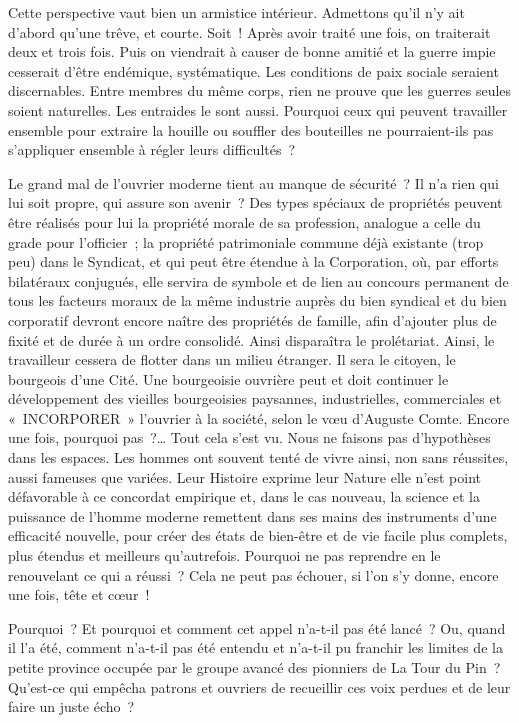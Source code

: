 \documentclass[french,twoside]{book} %
\begin{document}
Cette perspective vaut bien un armistice intérieur. Admettons qu’il n’y ait d’abord qu’une trêve, et courte. Soit ! Après avoir traité une fois, on traiterait deux et trois fois. Puis on viendrait à causer de bonne amitié et la guerre impie cesserait d’être endémique, systématique. Les conditions de paix sociale seraient discernables. Entre membres du même corps, rien ne prouve que les guerres seules soient naturelles. Les entraides le sont aussi. Pourquoi ceux qui peuvent travailler ensemble pour extraire la houille ou souffler des bouteilles ne pourraient-ils pas s’appliquer ensemble à régler leurs difficultés ?\par
Le grand mal de l’ouvrier moderne tient au manque de sécurité ? Il n’a rien qui lui soit propre, qui assure son avenir ? Des types spéciaux de propriétés peuvent être réalisés pour lui la propriété morale de sa profession, analogue a celle du grade pour l’officier ; la propriété patrimoniale commune déjà existante (trop peu) dans le Syndicat, et qui peut être étendue à la Corporation, où, par efforts bilatéraux conjugués, elle servira de symbole et de lien au concours permanent de tous les facteurs moraux de la même industrie auprès du bien syndical et du bien corporatif devront encore naître des propriétés de famille, afin d’ajouter plus de fixité et de durée à un ordre consolidé. Ainsi disparaîtra le prolétariat. Ainsi, le travailleur cessera de flotter dans un milieu étranger. Il sera le citoyen, le bourgeois d’une Cité. Une bourgeoisie ouvrière peut et doit continuer le développement des vieilles bourgeoisies paysannes, industrielles, commerciales et « INCORPORER » l’ouvrier à la société, selon le vœu d’Auguste Comte. Encore une fois, pourquoi pas ?… Tout cela s’est vu. Nous ne faisons pas d’hypothèses dans les espaces. Les hommes ont souvent tenté de vivre ainsi, non sans réussites, aussi fameuses que variées. Leur Histoire exprime leur Nature elle n’est point défavorable à ce concordat empirique et, dans le cas nouveau, la science et la puissance de l’homme moderne remettent dans ses mains des instruments d’une efficacité nouvelle, pour créer des états de bien-être et de vie facile plus complets, plus étendus et meilleurs qu’autrefois. Pourquoi ne pas reprendre en le renouvelant ce qui a réussi ? Cela ne peut pas échouer, si l’on s’y donne, encore une fois, tête et cœur !\par
Pourquoi ? Et pourquoi et comment cet appel n’a-t-il pas été lancé ? Ou, quand il l’a été, comment n’a-t-il pas été entendu et n’a-t-il pu franchir les limites de la petite province occupée par le groupe avancé des pionniers de La Tour du Pin ? Qu’est-ce qui empêcha patrons et ouvriers de recueillir ces voix perdues et de leur faire un juste écho ?\par
\end{document}
